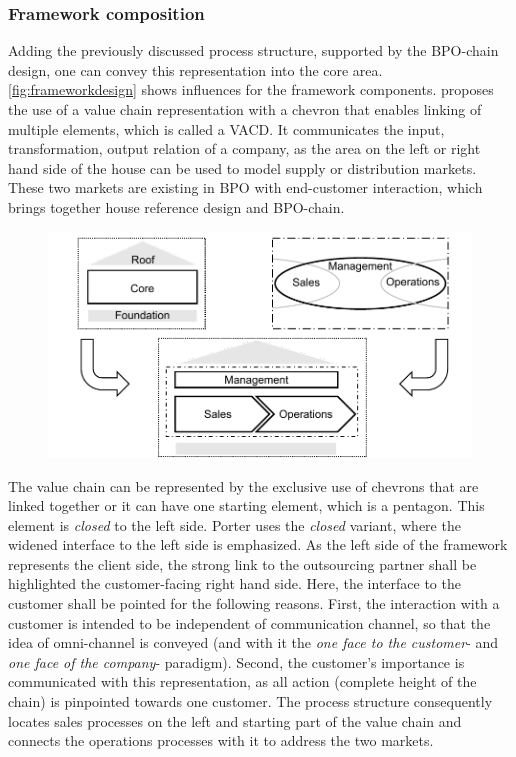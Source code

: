 	\subsubsection{Framework composition}
	
	Adding the previously discussed process structure, supported by the BPO-chain design, one can convey this representation into the core area. \Fig \ref{fig:frameworkdesign} shows influences for the framework components. 
	\citeauthor{Meise2001} proposes the use of a value chain representation with a chevron that enables linking of multiple elements, which is called a \acrfull{VACD}. It communicates the input, transformation, output relation of a company, as the area on the left or right hand side of the house can be used to model supply or distribution markets. 
	These two markets are existing in BPO with end-customer interaction, which brings together house reference design and \acrshort{BPO}-chain. 
	
	\begin{figure}[caption={Framework Design Influences}, label={fig:frameworkdesign}]
		{	\includegraphics[width=.8\textwidth]{figures/frameworkdesign.pdf}}
	\end{figure} 
	
	
	The value chain can be represented by the exclusive use of chevrons that are linked together or it can have one starting element, which is a pentagon. This element is \textit{closed} to the left side. Porter uses the \textit{closed} variant, where the widened interface to the left side is emphasized. As the left side of the framework represents the client side, the strong link to the outsourcing partner shall be highlighted \wrt the customer-facing right hand side. Here, the interface to the customer shall be pointed for the following reasons. First, the interaction with a customer is intended to be independent of communication channel, so that the idea of omni-channel is conveyed (and with it the \textit{one face to the customer}- and \textit{one face of the company}- paradigm). Second, the customer's importance is communicated with this representation, as all action (complete height of the chain) is pinpointed towards one customer. The  process structure consequently locates sales processes on the left and starting part of the value chain and connects the operations processes with it to address the two markets. 
	
